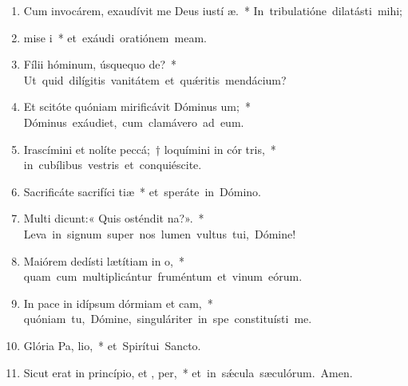 \begin{flushleft}
\begin{enumerate}[leftmargin=*]

\item Cum invocárem, exaudívit me Deus iustí æ.~* \mbox{In tribulatióne dilatásti mihi;}

\item mise i~* \mbox{et exáudi oratiónem meam.}

\item Fílii hóminum, úsquequo  de?~* \mbox{Ut quid dilígitis vanitátem et qu\'{\ae}ritis mendácium?}

\item Et scitóte quóniam mirificávit Dóminus  um;~* \mbox{Dóminus exáudiet, cum clamávero ad eum.}

\item Irascímini et nolíte peccá;~† loquímini in cór tris,~* \mbox{in cubílibus vestris et conquiéscite.}

\item Sacrificáte sacrifíci tiæ~* \mbox{et speráte in Dómino.}

\item Multi dicunt:« Quis osténdit  na?».~* \mbox{Leva in signum super nos lumen vultus tui, Dómine!}

\item Maiórem dedísti lætítiam in  o,~* \mbox{quam cum multiplicántur fruméntum et vinum eórum.}

\item In pace in idípsum dórmiam et cam,~* \mbox{quóniam tu, Dómine, singuláriter in spe constituísti me.}

\item Glória Pa,  lio,~* \mbox{et Spirítui Sancto.}

\item Sicut erat in princípio, et ,  per,~* \mbox{et in s\'{\ae}cula sæculórum. Amen.}


\end{enumerate}
\end{flushleft}

